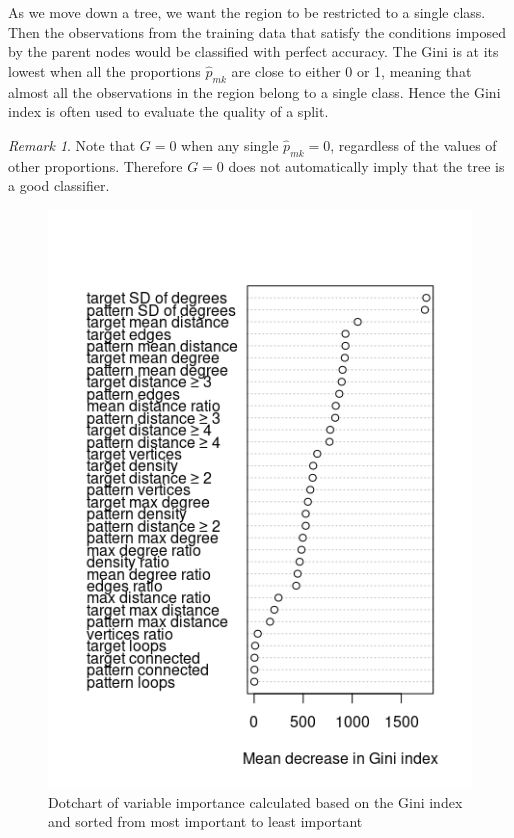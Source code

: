 \documentclass{l4proj}
\theoremstyle{definition}
\theoremstyle{remark}
\newtheorem{remark}{Remark}[section]
\begin{document}
As we move down a tree, we want the region to be restricted to a single class.
Then the observations from the training data that satisfy the conditions imposed
by the parent nodes would be classified with perfect accuracy. The Gini is at
its lowest when all the proportions $\hat{p}_{mk}$ are close to either 0 or 1,
meaning that almost all the observations in the region belong to a single class.
Hence the Gini index is often used to evaluate the quality of a split.

\begin{remark}
  Note that $G=0$ when any single $\hat{p}_{mk}=0$, regardless of the values of
  other proportions. Therefore $G=0$ does not automatically imply that the tree
  is a good classifier.
\end{remark}

\begin{figure}
  \centering
  \includegraphics{images/unlabelled_variable_importance.png}
  \caption{Dotchart of variable importance calculated based on the Gini index
    and sorted from most important to least important}
  \label{fig:unlabelled_variable_importance}
\end{figure}
\end{document}
